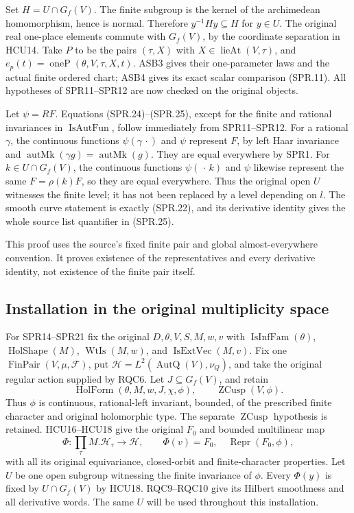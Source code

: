 Set \(H=U\cap G_f(V)\).
The finite subgroup is the kernel of the archimedean homomorphism,
hence is normal.  Therefore \(y^{-1}Hy\subseteq H\) for \(y\in U\).
The original real one-place elements commute with \(G_f(V)\),
by the coordinate separation in HCU14.
Take \(P\) to be the pairs \((\tau,X)\) with
\(X\in\operatorname{lieAt}(V,\tau)\), and
\(e_p(t)=\operatorname{oneP}(\theta,V,\tau,X,t)\).
ASB3 gives their one-parameter laws and the actual finite ordered
chart; ASB4 gives its exact scalar comparison (SPR.11).
All hypotheses of SPR11--SPR12 are now checked on the original
objects.

Let \(\psi=RF\).  Equations (SPR.24)--(SPR.25), except for the
finite and rational invariances in \(\operatorname{IsAutFun}\),
follow immediately from SPR11--SPR12.
For a rational \(\gamma\), the continuous functions
\(\psi(\gamma\,\cdot)\) and \(\psi\) represent \(F\), by left
Haar invariance and
\(\operatorname{autMk}(\gamma g)=\operatorname{autMk}(g)\).
They are equal everywhere by SPR1.
For \(k\in U\cap G_f(V)\), the continuous functions
\(\psi(\,\cdot\,k)\) and \(\psi\) likewise represent the same
\(F=\rho(k)F\), so they are equal everywhere.
Thus the original open \(U\) witnesses the finite level; it has
not been replaced by a level depending on \(l\).
The smooth curve statement is exactly (SPR.22), and its derivative
identity gives the whole source list quantifier in (SPR.25).

This proof uses the source's fixed finite pair and global
almost-everywhere convention.  It proves existence of the
representatives and every derivative identity, not existence
of the finite pair itself.

\subsection{Installation in the original multiplicity space}

For SPR14--SPR21 fix the original \(D,\theta,V,S,M,w,v\)
with \(\operatorname{IsInfFam}(\theta)\),
\(\operatorname{HolShape}(M)\), \(\operatorname{WtIs}(M,w)\), and
\(\operatorname{IsExtVec}(M,v)\).
Fix one \(\operatorname{FinPair}(V,\mu,\mathcal F)\), put
\(\mathcal H=L^2(\operatorname{AutQ}(V),\nu_Q)\), and take the
original regular action supplied by RQC6.
Let \(J\subseteq G_f(V)\), and retain
\[
 \operatorname{HolForm}(\theta,M,w,J,\chi,\phi),
                 \qquad \operatorname{ZCusp}(V,\phi).
 \tag{SPR.27}
\]
Thus \(\phi\) is continuous, rational-left invariant, bounded,
of the prescribed finite character and original holomorphic type.
The separate \(\operatorname{ZCusp}\) hypothesis is retained.
HCU16--HCU18 give the original \(F_0\) and bounded multilinear map
\[
       \Phi:\prod_\tau M.\mathcal H_\tau\longrightarrow\mathcal H,
       \qquad \Phi(v)=F_0,\quad
                     \operatorname{Repr}(F_0,\phi),
 \tag{SPR.28}
\]
with all its original equivariance, closed-orbit and finite-character
properties.
Let \(U\) be one open subgroup witnessing the finite invariance
of \(\phi\).  Every \(\Phi(y)\) is fixed by \(U\cap G_f(V)\)
by HCU18.  RQC9--RQC10 give its Hilbert smoothness and all derivative
words.  The same \(U\) will be used throughout this installation.

